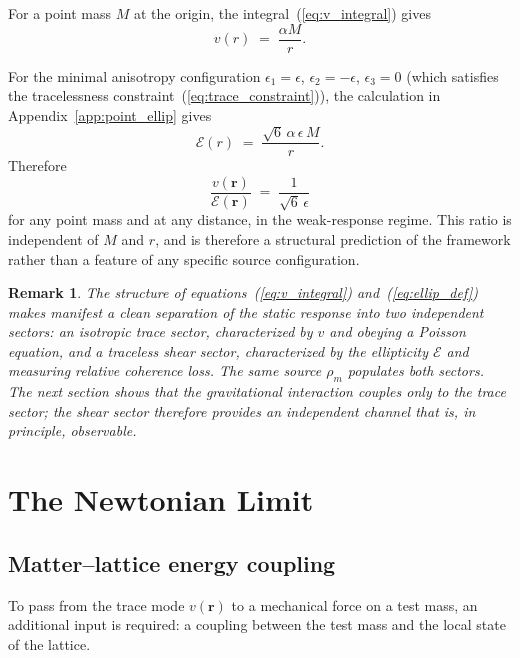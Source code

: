 \documentclass[a4paper,fleqn]{cas-dc}
\theoremstyle{thmstyleone}%
\theoremstyle{thmstyletwo}%
\newtheorem{remark}{Remark}%
\begin{document}
For a point mass $M$ at the origin, the
integral~(\ref{eq:v_integral}) gives
\begin{equation}
    v(r)
    \;=\;
    \frac{\alpha M}{r}.
    \label{eq:v_point}
\end{equation}

For the minimal anisotropy configuration
$\epsilon_1=\epsilon$, $\epsilon_2=-\epsilon$, $\epsilon_3=0$
(which satisfies the tracelessness
constraint~(\ref{eq:trace_constraint})), the calculation in
Appendix~\ref{app:point_ellip} gives
\begin{equation}
    \mathcal{E}(r)
    \;=\;
    \frac{\sqrt{6}\,\alpha\,\epsilon\,M}{r}.
    \label{eq:E_point}
\end{equation}
Therefore
\begin{equation}
\boxed{\;
    \frac{v(\mathbf{r})}{\mathcal{E}(\mathbf{r})}
    \;=\;
    \frac{1}{\sqrt{6}\,\epsilon}\;
}
\label{eq:v_E_ratio}
\end{equation}
for any point mass and at any distance, in the
weak-response regime. This ratio is independent of $M$ and
$r$, and is therefore a structural prediction of the framework
rather than a feature of any specific source configuration.

\begin{remark}
\label{rem:trace_shear_separation}
The structure of equations~(\ref{eq:v_integral})
and~(\ref{eq:ellip_def}) makes manifest a clean separation of
the static response into two independent sectors: an
\emph{isotropic} trace sector, characterized by 
$v$ and obeying a Poisson equation, and a \emph{traceless} shear
sector, characterized by the ellipticity $\mathcal{E}$ and
measuring relative coherence loss. The same source $\rho_m$
populates both sectors. The next section shows that the
gravitational interaction couples only to the trace sector;
the shear sector therefore provides an independent channel that
is, in principle, observable.
\end{remark}

\section{The Newtonian Limit}
\label{sec:newtonian}

\subsection{Matter--lattice energy coupling}

To pass from the trace mode $v(\mathbf{r})$ to a mechanical force on a test
mass, an additional input is required: a coupling between the
test mass and the local state of the lattice.
\end{document}
